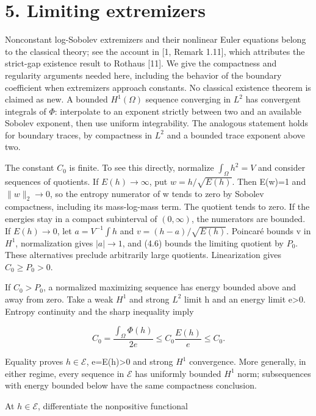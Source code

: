 \documentclass[11pt]{article}
\begin{document}
\section{5. Limiting extremizers}\label{limiting-extremizers}

Nonconstant log-Sobolev extremizers and their nonlinear Euler equations
belong to the classical theory; see the account in {[}1, Remark 1.11{]},
which attributes the strict-gap existence result to Rothaus {[}11{]}. We
give the compactness and regularity arguments needed here, including the
behavior of the boundary coefficient when extremizers approach
constants. No classical existence theorem is claimed as new. A bounded
\(H^{1}(\Omega )\) sequence converging in \(L^{2}\) has convergent
integrals of \(\Phi\): interpolate to an exponent strictly between two
and an available Sobolev exponent, then use uniform integrability. The
analogous statement holds for boundary traces, by compactness in
\(L^{2}\) and a bounded trace exponent above two.

The constant \(C_0\) is finite. To see this directly, normalize
\(\int _\Omega h^{2}=V\) and consider sequences of quotients. If
\(E(h)\to \infty\), put \(w=h/\sqrt{E(h)}\). Then E(w)=1 and
\(\|w\|_2\to0\), so the entropy numerator of w tends to zero by Sobolev
compactness, including its mass-log-mass term. The quotient tends to
zero. If the energies stay in a compact subinterval of \((0,\infty )\),
the numerators are bounded. If \(E(h)\to 0\), let \(a=V^{-1}\int h\) and
\(v=(h-a)/\sqrt{E(h)}\). Poincaré bounds v in \(H^{1}\), normalization
gives \(|a|\to 1\), and (4.6) bounds the limiting quotient by \(P_0\).
These alternatives preclude arbitrarily large quotients. Linearization
gives \(C_0\geq P_0>0\).

If \(C_0>P_0\), a normalized maximizing sequence has energy bounded
above and away from zero. Take a weak \(H^{1}\) and strong \(L^{2}\)
limit h and an energy limit e\textgreater0. Entropy continuity and the
sharp inequality imply

\[C_0=\frac{\int_\Omega\Phi(h)}{2e}
\leq C_0\frac{E(h)}e\leq C_0.\tag{5.1}\]

Equality proves \(h\in \mathcal{E}\), e=E(h)\textgreater0 and strong
\(H^{1}\) convergence. More generally, in either regime, every sequence
in \(\mathcal{E}\) has uniformly bounded \(H^{1}\) norm; subsequences
with energy bounded below have the same compactness conclusion.

At \(h\in \mathcal{E}\), differentiate the nonpositive functional
\end{document}
